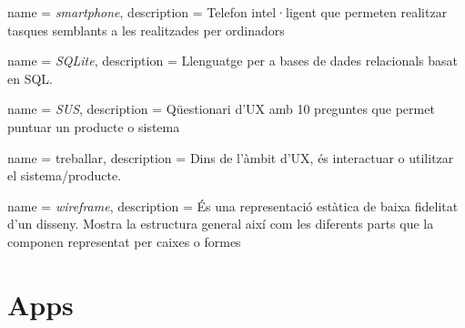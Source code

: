 {
name = \textit{smartphone}, description = {Telefon intel·ligent que permeten realitzar tasques semblants a les realitzades per ordinadors} 
}

{
name = \textit{SQLite}, description = {Llenguatge per a bases de dades relacionals basat en SQL.} 
}

{
name = \textit{SUS}, description = {Qüestionari d'UX amb 10 preguntes que permet puntuar un producte o sistema} 
}

{
name = treballar, description = {Dins de l'àmbit d'UX, és interactuar o utilitzar el sistema/producte.} 
}

{
name = \textit{wireframe}, description = {És una representació estàtica de baixa fidelitat d'un disseny. Mostra la estructura general així com les diferents parts que la componen representat per caixes o formes}
}




\printglossary


\chapter*{Apps}
\label{sec:apps}

